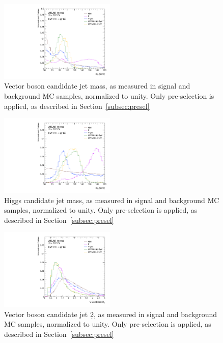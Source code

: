 \begin{figure}[htbp!]
\begin{center}
    \includegraphics[width=0.49\textwidth]{VHqqbb_SimpleSigBkgMC_mV.pdf}
\end{center}
\caption{Vector boson candidate jet mass, as measured in signal and background MC samples, normalized to unity. Only pre-selection is applied, as described in Section~\ref{subsec:presel}}
\label{fig:simple_mc_mV}
\end{figure}

\begin{figure}[htbp!]
\begin{center}
    \includegraphics[width=0.49\textwidth]{VHqqbb_SimpleSigBkgMC_mH.pdf}
\end{center}
\caption{Higgs candidate jet mass, as measured in signal and background MC samples, normalized to unity. Only pre-selection is applied, as described in Section~\ref{subsec:presel} }
\label{fig:simple_mc_mH}
\end{figure}

\begin{figure}[htbp!]
\begin{center}
    \includegraphics[width=0.49\textwidth]{VHqqbb_SimpleSigBkgMC_d2V.pdf}
\end{center}
\caption{Vector boson candidate jet \d2, as measured in signal and background MC samples, normalized to unity. Only pre-selection is applied, as described in Section~\ref{subsec:presel} }
\label{fig:simple_mc_d2V}
\end{figure}

